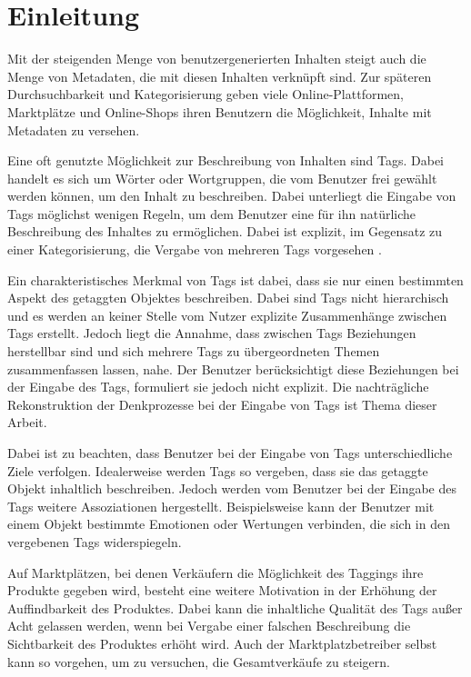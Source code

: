 \chapter{Einleitung}

Mit der steigenden Menge von benutzergenerierten Inhalten steigt auch die Menge von Metadaten, die mit diesen Inhalten verknüpft sind. Zur späteren Durchsuchbarkeit und Kategorisierung geben viele Online-Plattformen, Marktplätze und Online-Shops ihren Benutzern die Möglichkeit, Inhalte mit Metadaten zu versehen.

Eine oft genutzte Möglichkeit zur Beschreibung von Inhalten sind Tags. Dabei handelt es sich um Wörter oder Wortgruppen, die vom Benutzer frei gewählt werden können, um den Inhalt zu beschreiben. Dabei unterliegt die Eingabe von Tags möglichst wenigen Regeln, um dem Benutzer eine für ihn natürliche Beschreibung des Inhaltes zu ermöglichen. Dabei ist explizit, im Gegensatz zu einer Kategorisierung, die Vergabe von mehreren Tags vorgesehen \cite{sc2005}.

Ein charakteristisches Merkmal von Tags ist dabei, dass sie nur einen bestimmten Aspekt des getaggten Objektes beschreiben. Dabei sind Tags nicht hierarchisch und es werden an keiner Stelle vom Nutzer explizite Zusammenhänge zwischen Tags erstellt. Jedoch liegt die Annahme, dass zwischen Tags Beziehungen herstellbar sind und sich mehrere Tags zu übergeordneten Themen zusammenfassen lassen, nahe. Der Benutzer berücksichtigt diese Beziehungen bei der Eingabe des Tags, formuliert sie jedoch nicht explizit. Die nachträgliche Rekonstruktion der Denkprozesse bei der Eingabe von Tags ist Thema dieser Arbeit.

Dabei ist zu beachten, dass Benutzer bei der Eingabe von Tags unterschiedliche Ziele verfolgen. Idealerweise werden Tags so vergeben, dass sie das getaggte Objekt inhaltlich beschreiben. Jedoch werden vom Benutzer bei der Eingabe des Tags weitere Assoziationen hergestellt. Beispielsweise kann der Benutzer mit einem Objekt bestimmte Emotionen oder Wertungen verbinden, die sich in den vergebenen Tags widerspiegeln.

Auf Marktplätzen, bei denen Verkäufern die Möglichkeit des Taggings ihre Produkte gegeben wird, besteht eine weitere Motivation in der Erhöhung der Auffindbarkeit des Produktes. Dabei kann die inhaltliche Qualität des Tags außer Acht gelassen werden, wenn bei Vergabe einer falschen Beschreibung die Sichtbarkeit des Produktes erhöht wird. Auch der Marktplatzbetreiber selbst kann so vorgehen, um zu versuchen, die Gesamtverkäufe zu steigern.

